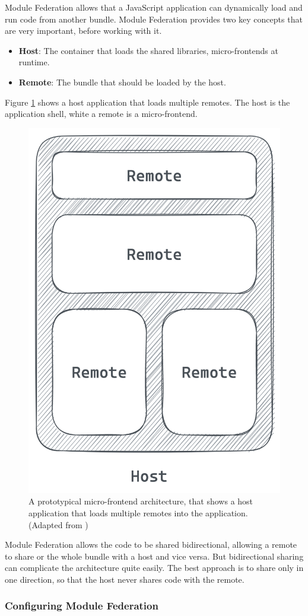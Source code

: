 Module Federation allows that a JavaScript application can dynamically load and run code from another bundle. Module Federation provides two key concepts that are very important, before working with it. \cite[118-119]{book:2021:mezzalira:applied-methods:building-micro-frontends}

\begin{itemize}
  \item \textbf{Host}: The container that loads the shared libraries, micro-frontends at runtime.
  \item \textbf{Remote}: The bundle that should be loaded by the host.
\end{itemize}

Figure \ref{fig:background:micro-frontend:module-federation:module-federation-architecture} shows a host application that loads multiple remotes. The host is the application shell, white a remote is a micro-frontend.

\ifshowImages
\begin{figure}[H]
\centering
\includegraphics[width=0.3\linewidth]{images/module-federation-architecture.png}
\caption{A prototypical micro-frontend architecture, that shows a host application that loads multiple remotes into the application. (Adapted from \cite[119]{book:2021:mezzalira:applied-methods:building-micro-frontends})
}\label{fig:background:micro-frontend:module-federation:module-federation-architecture}
\end{figure}
\fi

Module Federation allows the code to be shared bidirectional, allowing a remote to share or the whole bundle with a host and vice versa. But bidirectional sharing can complicate the architecture quite easily. The best approach is to share only in one direction, so that the host never shares code with the remote. \cite[119]{book:2021:mezzalira:applied-methods:building-micro-frontends}

\subsubsection{Configuring Module Federation}

